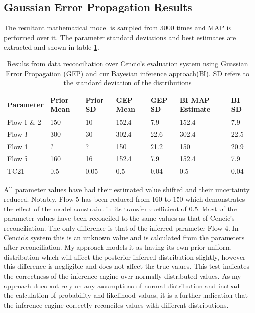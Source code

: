 \documentclass[ %
                    author={Tom Jager},
                supervisor={Dr. Daniel Schien},
                    degree={MEng},
                     title={A Bayesian Inference Engine for Calibrating Uncertainty over UMIS Structured MFA Systems},
                  subtitle={},
                      type={research},
                      year={2019} ]{dissertation}
\begin{document}
\subsection{Gaussian Error Propagation Results}
\label{sec:gauss_results}
The resultant mathematical model is sampled from $3000$ times and MAP is performed over it. The parameter standard deviations and best estimates are extracted and shown in table \ref{table:cencic_results}.

\begin{table}[h]
\begin{tabular}{|l|l|l|l|l|l|l|}
\hline
\textbf{Parameter} & \textbf{Prior Mean} & \textbf{Prior SD} & \textbf{GEP Mean} & \textbf{GEP SD} & \textbf{BI MAP Estimate} & \textbf{BI SD} \\ \hline
Flow 1 \& 2   & 150                 & 10                & 152.4                & 7.9                & 152.4                    & 7.9            \\ \hline
Flow 3             & 300                 & 30                & 302.4                & 22.6               & 302.4                    & 22.5           \\ \hline
Flow 4             & ?                   & ?                 & 150                  & 21.2               & 150                      & 20.9           \\ \hline
Flow 5             & 160                 & 16                & 152.4                & 7.9                & 152.4                    & 7.9            \\ \hline
TC21               & 0.5                 & 0.05              & 0.5                  & 0.04               & 0.5                      & 0.04           \\ \hline
\end{tabular}
\caption{Results from data reconciliation over Cencic's evaluation system using Guassian Error Propagation (GEP) and our Bayesian inference approach(BI). SD refers to the standard deviation of the distributions}
\label{table:cencic_results}
\end{table}

All parameter values have had their estimated value shifted and their uncertainty reduced. Notably, Flow 5 has been reduced from $160$ to $150$ which demonstrates the effect of the model constraint in its transfer coefficient of $0.5$. Most of the parameter values have been reconciled to the same values as that of Cencic's reconciliation. The only difference is that of the inferred parameter Flow 4. In Cencic's system this is an unknown value and is calculated from the parameters after reconciliation. My approach models it as having its own prior uniform distribution which will affect the posterior inferred distribution slightly, however this difference is negligible and does not affect the true values. This test indicates the correctness of the inference engine over normally distributed values. As my approach does not rely on any assumptions of normal distribution and instead the calculation of probability and likelihood values, it is a further indication that the inference engine correctly reconciles values with different distributions.  
\end{document}
